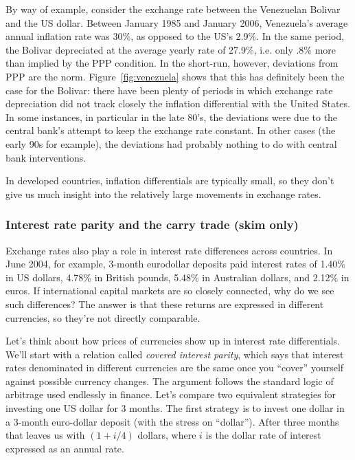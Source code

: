 \documentclass[letterpaper,12pt]{article}
\begin{document}
By way of example, consider the exchange rate between the Venezuelan
Bolivar and the US dollar. Between January 1985 and January 2006,
Venezuela's average annual inflation rate was 30\%, as opposed to
the US's 2.9\%. In the same period, the Bolivar
depreciated at the average yearly rate of 27.9\%, i.e. only .8\%
more than implied by the PPP condition. In the short-run, however,
deviations from PPP are the norm.
Figure~\ref{fig:venezuela} shows that this has definitely been the
case for the Bolivar: there have been plenty of periods in which
exchange rate depreciation did not track closely the inflation
differential with the United States. In some instances, in
particular in the late 80's, the deviations were due to the central
bank's attempt to keep the exchange rate constant.
In other cases (the early 90s for example), the deviations
had probably nothing to do with central bank interventions.

%
In developed countries, inflation differentials are typically small,
so they don't give us much insight into the relatively
large movements in exchange rates.  


\subsubsection*{Interest rate parity and the carry trade (skim only)}


Exchange rates also play a role in interest rate differences across
countries. In June 2004, for example, 3-month eurodollar deposits
paid interest rates of 1.40\% in US dollars, 4.78\% in British
pounds, 5.48\% in Australian dollars, and 2.12\% in euros. If
international capital markets are so closely connected, why do we see
such differences?  The answer is that these returns are
expressed in different currencies, so they're not directly comparable.

Let's think about how prices of currencies show up in interest rate
differentials. We'll start with a relation called {\em covered
interest parity}, which says that interest rates denominated in
different currencies are the same once you ``cover'' yourself
against possible currency changes.  The argument follows the
standard logic of arbitrage used endlessly in finance.  Let's
compare two equivalent strategies for investing one US dollar for 3
months. The first strategy is to invest one dollar in a 3-month
euro-dollar deposit (with the stress on ``dollar''). After three
months that leaves us with $(1+i/4)$  dollars, where $i$ is the
dollar rate of interest expressed as an annual rate.
\end{document}
